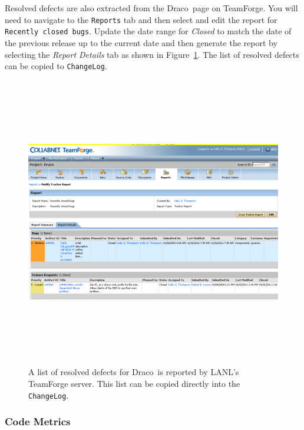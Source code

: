 \documentclass[note]{ResearchNote_pdf}
\newcommand{\draco}{{\normalfont\small\sffamily Draco}}
\begin{document}
Resolved defects are also extracted from the \draco\ page on
TeamForge.  You will need to navigate to the \texttt{Reports} tab and
then select and edit the report for \texttt{Recently closed bugs}.
Update the date range for \textit{Closed} to match the date of the
previous release up to the current date and then generate the report
by selecting the \textit{Report Details} tab as shown in
Figure~\ref{fig:sample-resolved-defect-list}.  The list of resolved
defects can be copied to \texttt{ChangeLog}.

\begin{figure}
  \centerline{ \includegraphics[height=5.0in, angle=90]
{sample-resolved-defect-list.png}}
  \caption{A list of resolved defects for \draco\ is reported by
    LANL's TeamForge server.  This list can be copied directly into
    the \texttt{ChangeLog}.}
  \label{fig:sample-resolved-defect-list}
\end{figure}


\subsubsection{Code Metrics}
\label{sec:code_metric}
\end{document}
